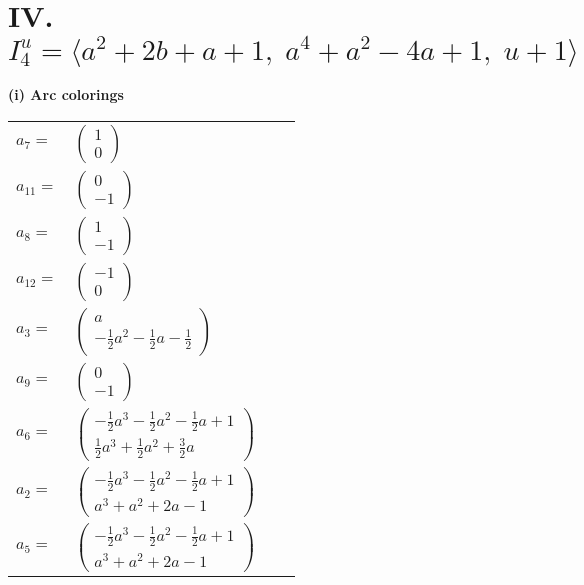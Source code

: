 \documentclass[1p]{elsarticle_modified}
\theoremstyle{definition}
\begin{document}
\centering \section*{IV. $I^u_{4}= \langle a^2+2 b+a+1,\;a^4+a^2-4 a+1,\;u+1 \rangle$}
\flushleft \textbf{(i) Arc colorings}\\
\begin{tabular}{m{7pt} m{180pt} m{7pt} m{180pt} }
\flushright $a_{7}=$&$\begin{pmatrix}1\\0\end{pmatrix}$ \\
\flushright $a_{11}=$&$\begin{pmatrix}0\\-1\end{pmatrix}$ \\
\flushright $a_{8}=$&$\begin{pmatrix}1\\-1\end{pmatrix}$ \\
\flushright $a_{12}=$&$\begin{pmatrix}-1\\0\end{pmatrix}$ \\
\flushright $a_{3}=$&$\begin{pmatrix}a\\-\frac{1}{2} a^2-\frac{1}{2} a-\frac{1}{2}\end{pmatrix}$ \\
\flushright $a_{9}=$&$\begin{pmatrix}0\\-1\end{pmatrix}$ \\
\flushright $a_{6}=$&$\begin{pmatrix}-\frac{1}{2} a^3-\frac{1}{2} a^2-\frac{1}{2} a+1\\\frac{1}{2} a^3+\frac{1}{2} a^2+\frac{3}{2} a\end{pmatrix}$ \\
\flushright $a_{2}=$&$\begin{pmatrix}-\frac{1}{2} a^3-\frac{1}{2} a^2-\frac{1}{2} a+1\\a^3+a^2+2 a-1\end{pmatrix}$ \\
\flushright $a_{5}=$&$\begin{pmatrix}-\frac{1}{2} a^3-\frac{1}{2} a^2-\frac{1}{2} a+1\\a^3+a^2+2 a-1\end{pmatrix}$ \\

\end{tabular}
\end{document}
